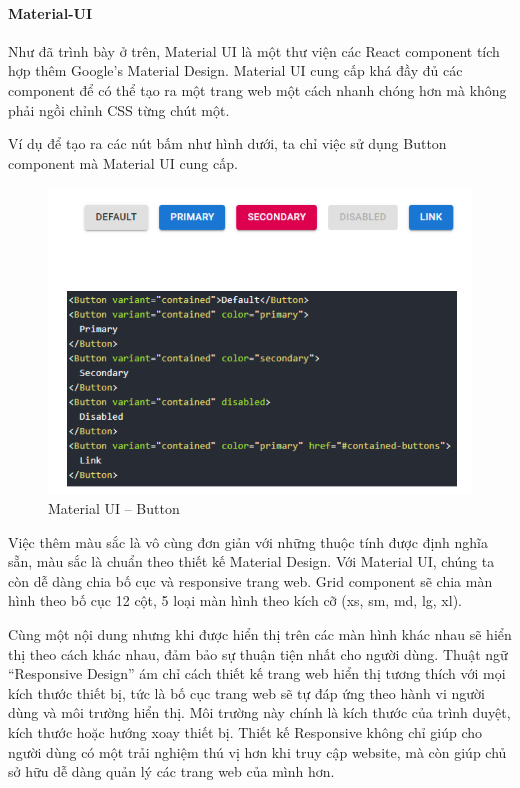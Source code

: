 \paragraph{Material-UI}
Như đã trình bày ở trên, Material UI là một thư viện các
React component tích hợp thêm Google’s Material Design.
Material UI cung cấp khá đầy đủ các component để có thể tạo
ra một trang web một cách nhanh chóng hơn mà không phải ngồi
chỉnh CSS từng chút một.

Ví dụ để tạo ra các nút bấm như hình dưới,
ta chỉ việc sử dụng Button component mà Material UI cung cấp.
\begin{figure}[H]
\centering
\includegraphics[width=14cm]{images/material-ui-button.png}
\caption{Material UI – Button}
\end{figure}

Việc thêm màu sắc là vô cùng đơn giản với những thuộc
tính được định nghĩa sẵn, màu sắc là chuẩn theo thiết
kế Material Design. 
Với Material UI, chúng ta còn dễ dàng chia bố cục và
responsive trang web. Grid component sẽ chia màn hình theo
bố cục 12 cột, 5 loại màn hình theo
kích cỡ (xs, sm, md, lg, xl).

Cùng một nội dung nhưng khi được hiển thị trên các màn
hình khác nhau sẽ hiển thị theo cách khác nhau, đảm bảo sự thuận
tiện nhất cho người dùng.  Thuật ngữ “Responsive Design” ám
chỉ cách thiết kế trang web hiển thị tương thích với mọi kích thước
thiết bị, tức là bố cục trang web sẽ tự đáp ứng theo hành vi
người dùng và môi trường hiển thị. Môi trường này chính là kích thước
của trình duyệt, kích thước hoặc hướng xoay thiết bị. Thiết
kế Responsive không chỉ giúp cho người dùng có một trải nghiệm thú
vị hơn khi truy cập website, mà còn giúp chủ sở hữu dễ dàng
quản lý các trang web của mình hơn.

